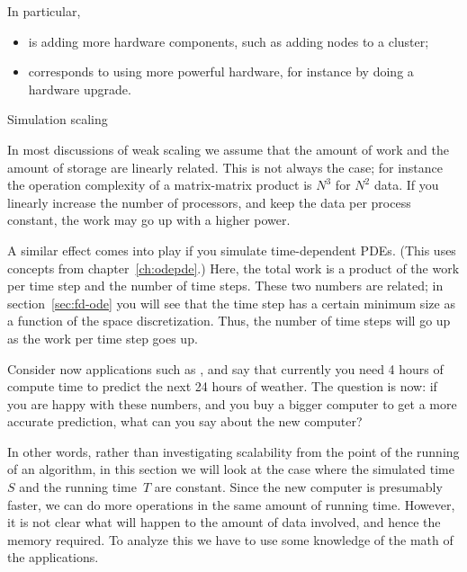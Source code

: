 In particular,
\begin{itemize}
\item {} is adding more hardware components,
  such as adding nodes to a cluster;
\item {} corresponds to using more powerful
  hardware, for instance by doing a hardware upgrade.
\end{itemize}

 {Simulation scaling}

In most discussions of weak scaling
we assume that the amount of work and 
the amount of storage are linearly related. This is not always the case; for instance
the operation complexity of a matrix-matrix product is $N^3$ for $N^2$ data.
If you linearly increase the number of processors, and keep the data
per process constant, the work may go up with a higher power.

A similar effect comes into play if you simulate time-dependent \acp{PDE}.
(This uses concepts from chapter~\ref{ch:odepde}.)
Here, the total work is a product of the work per time step and the number of 
time steps. These two numbers are related; in section~\ref{sec:fd-ode} you
will see that the time step has a certain minimum size as a function of the 
space discretization. Thus, the number of time steps will go up as the work per
time step goes up.

Consider now applications such as ,
and say that currently you need 4 hours of compute time
to predict the next 24 hours of weather.
The question is now: if you are happy with these numbers,
and you buy a bigger computer to get a more accurate prediction,
what can you say about the new computer?

In other words, 
rather than investigating scalability from the point of the running
of an algorithm, in this section we will look at the case where the simulated time~$S$
and the running time~$T$ are constant.
Since the new computer is presumably faster, we can do more operations
in the same amount of running time.
However, it is not clear what will happen to the amount of data involved,
and hence the memory required. To analyze this we have to
use some knowledge of the math of the applications.

